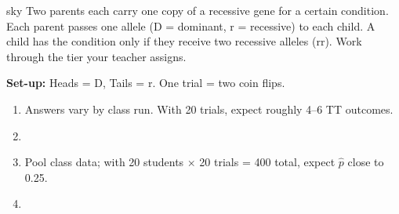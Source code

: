 \documentclass[10pt]{article}
\begin{document}
\namepartnerperiod

\vspace{0.1in}

\begin{scenariobox}[Context]{sky}
\small
Two parents each carry one copy of a recessive gene for a certain condition. Each parent
passes one allele (D = dominant, r = recessive) to each child. A child has the condition
only if they receive two recessive alleles (rr). Work through the tier your teacher assigns.
\end{scenariobox}

\vspace{0.1in}

\begin{tcolorbox}[colback=goldbg, colframe=goldacc, boxrule=1pt, arc=2mm,
    left=4mm, right=4mm, top=3mm, bottom=3mm,
    title={\bfseries Tier R \enspace Remediate --- Run a Pre-Designed Simulation}]
\small

\textbf{Set-up:} Heads = D, Tails = r. One trial = two coin flips.

\vspace{8pt}
\begin{enumerate}[leftmargin=1.5em, itemsep=8pt]
  \item \begin{teachernote}Answers vary by class run. With 20 trials, expect roughly 4--6 TT outcomes.\end{teachernote}
  \item {}
  \item \begin{teachernote}Pool class data; with 20 students $\times$ 20 trials = 400 total, expect $\hat{p}$ close to 0.25.\end{teachernote}
  \item {}
\end{enumerate}

\end{tcolorbox}

\vspace{0.1in}
\end{document}
